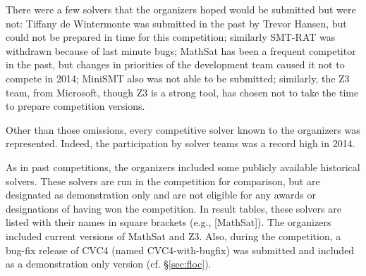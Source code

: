 \documentclass[twoside,11pt]{article}
\begin{document}
There were a few solvers that the organizers hoped would be submitted but were not: Tiffany de Wintermonte was submitted in the past by Trevor Hansen, but could not be prepared in time for this competition; similarly SMT-RAT was withdrawn because of last minute bugs; MathSat has been a frequent competitor in the past, but changes in priorities of the development team caused it not to compete in 2014; MiniSMT also was not able to be submitted; similarly, the Z3 team, from Microsoft, though Z3 is a strong tool, has chosen not to take the time to prepare competition versions.

Other than those omissions, every competitive solver known to the organizers was represented. Indeed, the participation by solver teams was a record high in 2014. 

As in past competitions, the organizers included some publicly available historical solvers. These solvers are run in the competition for comparison, but are designated as demonstration only and are not eligible for any awards or designations of having won the competition. In result tables, these solvers are listed with their names in square brackets (e.g., [MathSat]). The organizers included current versions of MathSat and Z3. Also, during the competition, a bug-fix release of CVC4 (named CVC4-with-bugfix) was submitted and included as a demonstration only version (cf. \S\ref{sec:floc}).
\end{document}
